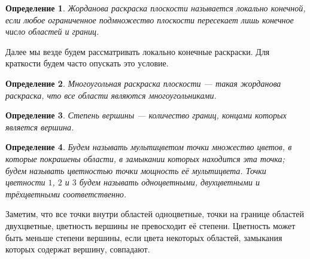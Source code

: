 \documentclass[12pt,a4paper]{article}
\newtheorem{mydef}{Определение}
\begin{document}
\begin{mydef}
    Жорданова раскраска плоскости называется локально конечной, если любое ограниченное подмножество плоскости пересекает лишь конечное число областей и границ.
\end{mydef}

Далее мы везде будем рассматривать локально конечные раскраски. Для краткости будем часто опускать это условие.



\begin{mydef}
    Многоугольная раскраска плоскости --- такая жорданова раскраска, что все области являются многоугольниками.
\end{mydef}

\begin{mydef}
    Степень вершины --- количество границ, концами которых является вершина.
\end{mydef}

\begin{mydef}
	Будем называть мультицветом точки множество цветов, в которые покрашены области, в замыкании которых находится эта точка; будем называть цветностью точки мощность её мультицвета. Точки цветности $1$, $2$ и $3$ будем называть одноцветными, двухцветными и трёхцветными соответственно.
\end{mydef}

Заметим, что все точки внутри областей одноцветные, точки на границе областей  двухцветные,%
цветность вершины не превосходит её степени. Цветность может быть меньше степени вершины, если цвета некоторых областей, замыкания которых содержат вершину, совпадают.
\end{document}
